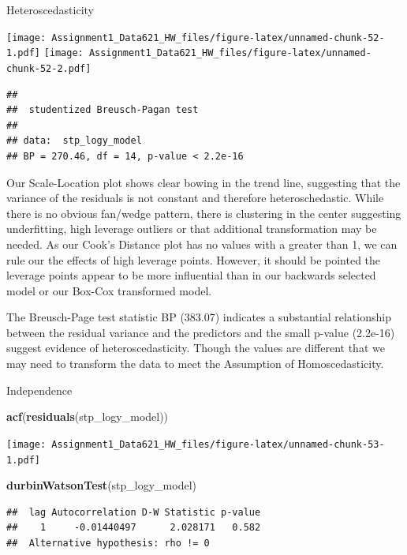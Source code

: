 \documentclass[
]{article}
\newenvironment{Shaded}{\begin{snugshade}}{\end{snugshade}}
\newcommand{\FunctionTok}[1]{\textcolor[rgb]{0.13,0.29,0.53}{\textbf{#1}}}
\newcommand{\NormalTok}[1]{#1}
\begin{document}
Heteroscedasticity

\texttt{[image: Assignment1\_Data621\_HW\_files/figure-latex/unnamed-chunk-52-1.pdf]}
\texttt{[image: Assignment1\_Data621\_HW\_files/figure-latex/unnamed-chunk-52-2.pdf]}

\begin{verbatim}
## 
##  studentized Breusch-Pagan test
## 
## data:  stp_logy_model
## BP = 270.46, df = 14, p-value < 2.2e-16
\end{verbatim}

Our Scale-Location plot shows clear bowing in the trend line, suggesting
that the variance of the residuals is not constant and therefore
heteroschedastic. While there is no obvious fan/wedge pattern, there is
clustering in the center suggesting underfitting, high leverage outliers
or that additional transformation may be needed. As our Cook's Distance
plot has no values with a greater than 1, we can rule our the effects of
high leverage points. However, it should be pointed the leverage points
appear to be more influential than in our backwards selected model or
our Box-Cox transformed model.

The Breusch-Page test statistic BP (383.07) indicates a substantial
relationship between the residual variance and the predictors and the
small p-value (2.2e-16) suggest evidence of heteroscedasticity. Though
the values are different that we may need to transform the data to meet
the Assumption of Homoscedasticity.

Independence

\begin{Shaded}
\begin{Highlighting}[]
\FunctionTok{acf}\NormalTok{(}\FunctionTok{residuals}\NormalTok{(stp\_logy\_model))}
\end{Highlighting}
\end{Shaded}

\texttt{[image: Assignment1\_Data621\_HW\_files/figure-latex/unnamed-chunk-53-1.pdf]}

\begin{Shaded}
\begin{Highlighting}[]
\FunctionTok{durbinWatsonTest}\NormalTok{(stp\_logy\_model)}
\end{Highlighting}
\end{Shaded}

\begin{verbatim}
##  lag Autocorrelation D-W Statistic p-value
##    1     -0.01440497      2.028171   0.582
##  Alternative hypothesis: rho != 0
\end{verbatim}
\end{document}
